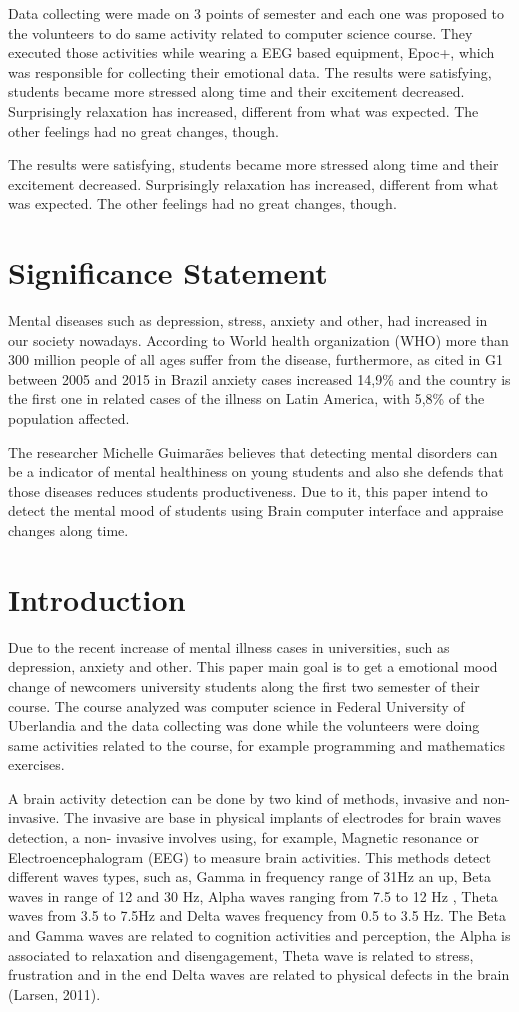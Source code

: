 \documentclass[12pt,openright,a4paper]{article}
\begin{document}
Data collecting were made on 3 points of semester and each one was proposed to the volunteers to do  same activity related to computer science course. They executed those activities  while wearing a EEG based equipment, Epoc+, which was responsible for collecting their emotional data.
The results were satisfying,  students became more stressed along time and their excitement decreased.     Surprisingly relaxation has increased, different from what was expected. The other feelings had no great changes, though.

The results were satisfying,  students became more stressed along time and their excitement decreased.     Surprisingly relaxation has increased, different from what was expected. The other feelings had no great changes, though.
\section{Significance Statement}
Mental diseases such as depression, stress, anxiety and other, had increased in our society nowadays.  According to World health organization (WHO)  more than 300 million people of all ages suffer from the disease, furthermore, as cited in G1 between 2005 and 2015 in Brazil anxiety cases increased 14,9\% and the country is the first one in related cases of the illness on Latin America, with 5,8\% of the population affected. 

The researcher Michelle Guimarães believes that detecting mental disorders can be a indicator of mental healthiness on young students and also she defends that those diseases reduces students productiveness. Due to it, this paper intend to detect the mental mood of students using Brain computer interface and appraise changes along time.  
\section{Introduction}
Due to the recent increase of mental illness cases in universities, such as depression, anxiety and other. This paper main goal is to get a emotional mood change of newcomers university students along the first two semester of their course. The course analyzed was computer science in Federal University of Uberlandia and the data collecting was done while the volunteers were doing same activities related to the course, for example programming and mathematics exercises.

A brain activity detection can be done by two kind of methods, invasive and non-invasive. The invasive  are base in physical implants of electrodes for brain waves detection, a non- invasive involves using, for example, Magnetic resonance or Electroencephalogram (EEG) to measure brain activities. This methods detect different waves types, such as, Gamma in frequency range of 31Hz  an up, Beta waves in range of 12 and 30 Hz, Alpha waves ranging from 7.5 to 12 Hz , Theta waves from 3.5 to 7.5Hz and Delta waves frequency from 0.5 to 3.5 Hz. The Beta and Gamma waves are related to cognition activities and perception, the Alpha is associated to relaxation and disengagement, Theta wave is related to stress, frustration and in the end Delta waves are related to physical defects in the brain (Larsen, 2011).
\end{document}
